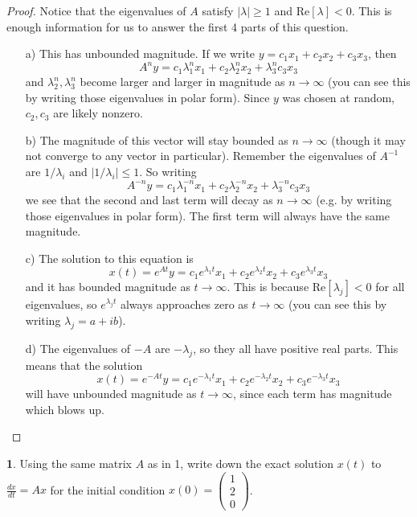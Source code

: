 \documentclass{article}
\theoremstyle{definition}
\newtheorem{prob}{}
\begin{document}
\begin{proof}
	Notice that the eigenvalues of $A$ satisfy $|\lambda|\geq 1$ and $\mathrm{Re}[\lambda]<0$. This is enough information for us to answer the first 4 parts of this question.
	\begin{itemize}
		\item[a)] This has unbounded magnitude. If we write $y= c_1 x_1 + c_2 x_2 + c_3 x_3$, then 
		\[A^n y=c_1 \lambda_1^n x_1 + c_2 \lambda_2^n x_2 + \lambda_3^n c_3 x_3 \]
		and $\lambda_2^n, \lambda_3^n$ become larger and larger in magnitude as $n \to \infty$ (you can see this by writing those eigenvalues in polar form). Since $y$ was chosen at random, $c_2, c_3$ are likely nonzero.
		\item[b)] The magnitude of this vector will stay bounded as $n \to \infty$ (though it may not converge to any vector in particular). Remember the eigenvalues of $A^{-1}$ are $1/\lambda_i$ and $|1/\lambda_i|\leq 1$. So writing
		\[A^{-n} y=c_1 \lambda_1^{-n} x_1 + c_2 \lambda_2^{-n} x_2 + \lambda_3^{-n }c_3 x_3 \]
		we see that the second and last term will decay as $n \to \infty$ (e.g. by writing those eigenvalues in polar form). The first term will always have the same magnitude.
		\item[c)] The solution to this equation is 
		\[x(t)= e^{At}y=c_1 e^{\lambda_1t}x_1 + c_2 e^{\lambda_2t}x_2 +c_3 e^{\lambda_3t}x_3\]
		and it has bounded magnitude as $t \to \infty$. This is because $\mathrm{Re}[\lambda_j]<0$ for all eigenvalues, so $e^{\lambda_jt}$ always approaches zero as $t \to \infty$ (you can see this by writing $\lambda_j= a+ ib$). 
		\item[d)] The eigenvalues of $-A$ are $-\lambda_j$, so they all have positive real parts. This means that the solution 
			\[x(t)= e^{-At}y=c_1 e^{-\lambda_1t}x_1 + c_2 e^{-\lambda_2t}x_2 +c_3 e^{-\lambda_3t}x_3\]
			will have unbounded magnitude as $t \to \infty$, since each term has magnitude which blows up.
	\end{itemize}
\end{proof}


\begin{prob}
	Using the same matrix $A$ as in 1, write down the exact solution $x(t)$ to $\frac{dx}{dt}= Ax$ for the initial condition $x(0)= \begin{pmatrix}
		1\\2\\0
	\end{pmatrix}$.
\end{prob}
\end{document}
